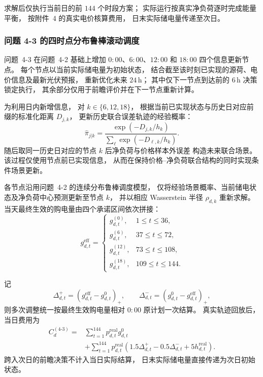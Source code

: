 \documentclass[zihao=-4,a4paper,UTF8,fontset=none]{ctexart}
\begin{document}
求解后仅执行当前日的前 $144$ 个时段方案；
实际运行按真实净负荷逐时完成能量平衡，
按附件~4 的真实电价核算费用，
日末实际储电量传递至次日。
\subsubsection{问题 4-3 的四时点分布鲁棒滚动调度}
问题~4-3 在问题~4-2 基础上增加
$0{:}00$、$6{:}00$、$12{:}00$ 和 $18{:}00$
四个信息更新节点。
每个节点以当前实际储电量为初始状态，
结合截至该时刻已实现的源荷、电价信息及最新光伏预报，
重新优化未来 $24\,\mathrm h$；
其中仅下一节点到达前的 $6\,\mathrm h$ 决策锁定执行，
其余部分仅用于前瞻评价并在下一节点重新计算。

为利用日内新增信息，
对 $k\in\{6,12,18\}$，
根据当前已实现状态与历史日对应前缀的标准化距离
$D_{j,k}$，
更新历史联合误差轨迹的经验概率：
\begin{equation}
    \widehat\pi_{j|k}
    =
    \frac{\exp(-D_{j,k}/h_k)}
    {\sum_{\ell}\exp(-D_{\ell,k}/h_k)} .
    \label{eq:q43_conditional_weight}
\end{equation}
随后取同一历史日对应的节点 $k$ 后净负荷与价格样本外误差
构造未来联合场景。
该过程仅使用节点前已实现信息，
从而在保持价格--净负荷联合结构的同时实现条件场景更新。

各节点沿用问题~4-2 的连续分布鲁棒调度模型，
仅将经验场景概率、当前储电状态及净负荷中心预测更新至节点 $k$，
并以相应 Wasserstein 半径 $\rho_{d,k}$ 重新求解。
当天最终生效的购电量由四个承诺区间依次拼接：
\begin{equation}
g_{d,t}^{\mathrm{eff}}
=
\begin{cases}
g_{d,t}^{(0)},  & 1\le t\le36,\\
g_{d,t}^{(6)},  & 37\le t\le72,\\
g_{d,t}^{(12)}, & 73\le t\le108,\\
g_{d,t}^{(18)}, & 109\le t\le144.
\end{cases}
\label{eq:q43_effective_purchase}
\end{equation}

记
\[
\Delta_{d,t}^{+}
=
\left(g_{d,t}^{\mathrm{eff}}-g_{d,t}^{0}\right)_+,
\qquad
\Delta_{d,t}^{-}
=
\left(g_{d,t}^{0}-g_{d,t}^{\mathrm{eff}}\right)_+ ,
\]
则多次调整统一按最终生效购电量相对 $0{:}00$ 原计划一次结算。
真实轨迹回放后，当日费用为
\begin{equation}
\begin{aligned}
C_d^{(4\text{-}3)}
={}&
\sum_{t=1}^{144}
p_{d,t}^{\mathrm{real}}g_{d,t}^{0}
\\
&+
\sum_{t=1}^{144}
p_{d,t}^{\mathrm{real}}
\left(
1.5\Delta_{d,t}^{+}
-0.5\Delta_{d,t}^{-}
+5h_{d,t}^{\mathrm{real}}
\right).
\end{aligned}
\label{eq:q43_realized_cost}
\end{equation}
跨入次日的前瞻决策不计入当日实际结算，
日末实际储电量直接传递为次日初始状态。
\end{document}
